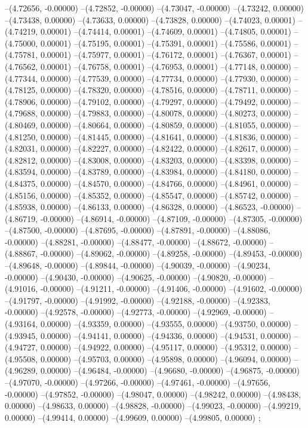 --(4.72656, -0.00000)
--(4.72852, -0.00000)
--(4.73047, -0.00000)
--(4.73242, 0.00000)
--(4.73438, 0.00000)
--(4.73633, 0.00000)
--(4.73828, 0.00000)
--(4.74023, 0.00001)
--(4.74219, 0.00001)
--(4.74414, 0.00001)
--(4.74609, 0.00001)
--(4.74805, 0.00001)
--(4.75000, 0.00001)
--(4.75195, 0.00001)
--(4.75391, 0.00001)
--(4.75586, 0.00001)
--(4.75781, 0.00001)
--(4.75977, 0.00001)
--(4.76172, 0.00001)
--(4.76367, 0.00001)
--(4.76562, 0.00001)
--(4.76758, 0.00001)
--(4.76953, 0.00001)
--(4.77148, 0.00000)
--(4.77344, 0.00000)
--(4.77539, 0.00000)
--(4.77734, 0.00000)
--(4.77930, 0.00000)
--(4.78125, 0.00000)
--(4.78320, 0.00000)
--(4.78516, 0.00000)
--(4.78711, 0.00000)
--(4.78906, 0.00000)
--(4.79102, 0.00000)
--(4.79297, 0.00000)
--(4.79492, 0.00000)
--(4.79688, 0.00000)
--(4.79883, 0.00000)
--(4.80078, 0.00000)
--(4.80273, 0.00000)
--(4.80469, 0.00000)
--(4.80664, 0.00000)
--(4.80859, 0.00000)
--(4.81055, 0.00000)
--(4.81250, 0.00000)
--(4.81445, 0.00000)
--(4.81641, 0.00000)
--(4.81836, 0.00000)
--(4.82031, 0.00000)
--(4.82227, 0.00000)
--(4.82422, 0.00000)
--(4.82617, 0.00000)
--(4.82812, 0.00000)
--(4.83008, 0.00000)
--(4.83203, 0.00000)
--(4.83398, 0.00000)
--(4.83594, 0.00000)
--(4.83789, 0.00000)
--(4.83984, 0.00000)
--(4.84180, 0.00000)
--(4.84375, 0.00000)
--(4.84570, 0.00000)
--(4.84766, 0.00000)
--(4.84961, 0.00000)
--(4.85156, 0.00000)
--(4.85352, 0.00000)
--(4.85547, 0.00000)
--(4.85742, 0.00000)
--(4.85938, 0.00000)
--(4.86133, 0.00000)
--(4.86328, 0.00000)
--(4.86523, -0.00000)
--(4.86719, -0.00000)
--(4.86914, -0.00000)
--(4.87109, -0.00000)
--(4.87305, -0.00000)
--(4.87500, -0.00000)
--(4.87695, -0.00000)
--(4.87891, -0.00000)
--(4.88086, -0.00000)
--(4.88281, -0.00000)
--(4.88477, -0.00000)
--(4.88672, -0.00000)
--(4.88867, -0.00000)
--(4.89062, -0.00000)
--(4.89258, -0.00000)
--(4.89453, -0.00000)
--(4.89648, -0.00000)
--(4.89844, -0.00000)
--(4.90039, -0.00000)
--(4.90234, -0.00000)
--(4.90430, -0.00000)
--(4.90625, -0.00000)
--(4.90820, -0.00000)
--(4.91016, -0.00000)
--(4.91211, -0.00000)
--(4.91406, -0.00000)
--(4.91602, -0.00000)
--(4.91797, -0.00000)
--(4.91992, -0.00000)
--(4.92188, -0.00000)
--(4.92383, -0.00000)
--(4.92578, -0.00000)
--(4.92773, -0.00000)
--(4.92969, -0.00000)
--(4.93164, 0.00000)
--(4.93359, 0.00000)
--(4.93555, 0.00000)
--(4.93750, 0.00000)
--(4.93945, 0.00000)
--(4.94141, 0.00000)
--(4.94336, 0.00000)
--(4.94531, 0.00000)
--(4.94727, 0.00000)
--(4.94922, 0.00000)
--(4.95117, 0.00000)
--(4.95312, 0.00000)
--(4.95508, 0.00000)
--(4.95703, 0.00000)
--(4.95898, 0.00000)
--(4.96094, 0.00000)
--(4.96289, 0.00000)
--(4.96484, -0.00000)
--(4.96680, -0.00000)
--(4.96875, -0.00000)
--(4.97070, -0.00000)
--(4.97266, -0.00000)
--(4.97461, -0.00000)
--(4.97656, -0.00000)
--(4.97852, -0.00000)
--(4.98047, 0.00000)
--(4.98242, 0.00000)
--(4.98438, 0.00000)
--(4.98633, 0.00000)
--(4.98828, -0.00000)
--(4.99023, -0.00000)
--(4.99219, 0.00000)
--(4.99414, 0.00000)
--(4.99609, 0.00000)
--(4.99805, 0.00000)
;
